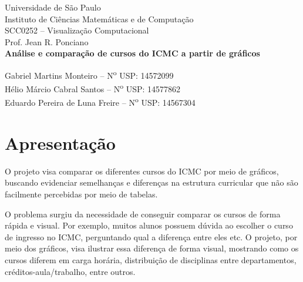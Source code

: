 \documentclass[12pt]{article}
\begin{document}
\begin{titlepage}
    \centering
    \vspace*{1cm}

    \vspace{1.5cm}

    {\large Universidade de São Paulo}\\[0.2cm]
    {\large Instituto de Ciências Matemáticas e de Computação}\\[1.5cm]

    {\large SCC0252 -- Visualização Computacional}\\[0.2cm]
    {\large Prof. Jean R. Ponciano}\\[2.5cm]

    {\LARGE \textbf{Análise e comparação de cursos do ICMC a partir de gráficos}}\\[3cm]

    {\large
    Gabriel Martins Monteiro -- N\textsuperscript{o} USP: 14572099\\[0.3cm]
    Hélio Márcio Cabral Santos -- N\textsuperscript{o} USP: 14577862\\[0.3cm]
    Eduardo Pereira de Luna Freire -- N\textsuperscript{o} USP: 14567304\par}
\end{titlepage}


\section{Apresentação}

O projeto visa comparar os diferentes cursos do ICMC por meio de gráficos,
buscando evidenciar semelhanças e diferenças na estrutura curricular que não
são facilmente percebidas por meio de tabelas.

O problema surgiu da necessidade de conseguir comparar os cursos de forma
rápida e visual. Por exemplo, muitos alunos possuem dúvida ao escolher o curso
de ingresso no ICMC, perguntando qual a diferença entre eles etc. O projeto,
por meio dos gráficos, visa ilustrar essa diferença de forma visual, mostrando
como os cursos diferem em carga horária, distribuição de disciplinas entre
departamentos, créditos-aula/trabalho, entre outros.
\end{document}
